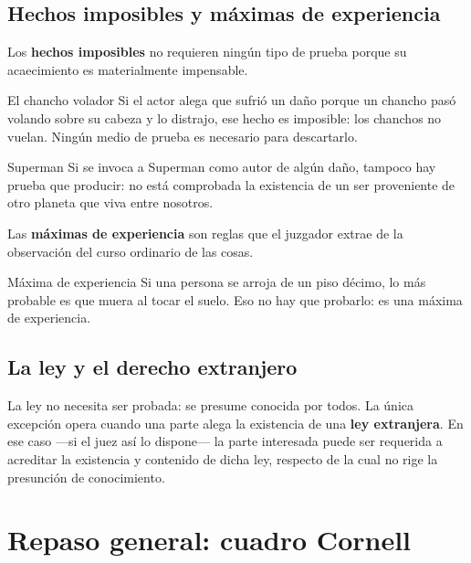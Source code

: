\documentclass[12pt,oneside]{book}
\begin{document}
\section{Hechos imposibles y máximas de experiencia}

Los \textbf{hechos imposibles} no requieren ningún tipo de prueba porque su acaecimiento es materialmente impensable.

\begin{example}{El chancho volador}
Si el actor alega que sufrió un daño porque un chancho pasó volando sobre su cabeza y lo distrajo, ese hecho es imposible: los chanchos no vuelan. Ningún medio de prueba es necesario para descartarlo.
\end{example}

\begin{example}{Superman}
Si se invoca a Superman como autor de algún daño, tampoco hay prueba que producir: no está comprobada la existencia de un ser proveniente de otro planeta que viva entre nosotros.
\end{example}

Las \textbf{máximas de experiencia} son reglas que el juzgador extrae de la observación del curso ordinario de las cosas.

\begin{example}{Máxima de experiencia}
Si una persona se arroja de un piso décimo, lo más probable es que muera al tocar el suelo. Eso no hay que probarlo: es una máxima de experiencia.
\end{example}

\section{La ley y el derecho extranjero}

La ley no necesita ser probada: se presume conocida por todos. La única excepción opera cuando una parte alega la existencia de una \textbf{ley extranjera}. En ese caso —si el juez así lo dispone— la parte interesada puede ser requerida a acreditar la existencia y contenido de dicha ley, respecto de la cual no rige la presunción de conocimiento.

\chapter{Repaso general: cuadro Cornell}
\end{document}
